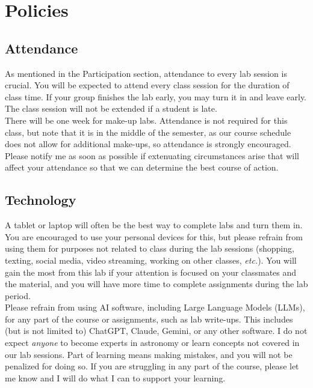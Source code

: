 \documentclass[11pt]{article}
\begin{document}
\section*{Policies}
 
\subsection*{Attendance}
 

As mentioned in the Participation section, attendance to every lab session is crucial. You will be expected to attend every class session for the duration of class time. If your group finishes the lab early, you may turn it in and leave early. The class session will not be extended if a student is late. \\

There will be one week for make-up labs. Attendance is not required for this class, but note that it is in the middle of the semester, as our course schedule does not allow for additional make-ups, so attendance is strongly encouraged. Please notify me as soon as possible if extenuating circumstances arise that will affect your attendance so that we can determine the best course of action. \\

\subsection*{Technology}

\noindent A tablet or laptop will often be the best way to complete labs and turn them in. You are encouraged to use your personal devices for this, but please refrain from using them for purposes not related to class during the lab sessions (shopping, texting, social media, video streaming, working on other classes, \textit{etc.}). You will gain the most from this lab if your attention is focused on your classmates and the material, and you will have more time to complete assignments during the lab period.  \\

Please refrain from using AI software, including Large Language Models (LLMs), for any part of the course or assignments, such as lab write-ups. This includes (but is not limited to) ChatGPT, Claude, Gemini, or any other software. I do not expect \textit{anyone} to become experts in astronomy or learn concepts not covered in our lab sessions. Part of learning means making mistakes, and you will not be penalized for doing so. If you are struggling in any part of the course, please let me know and I will do what I can to support your learning. \\
 
\end{document}
